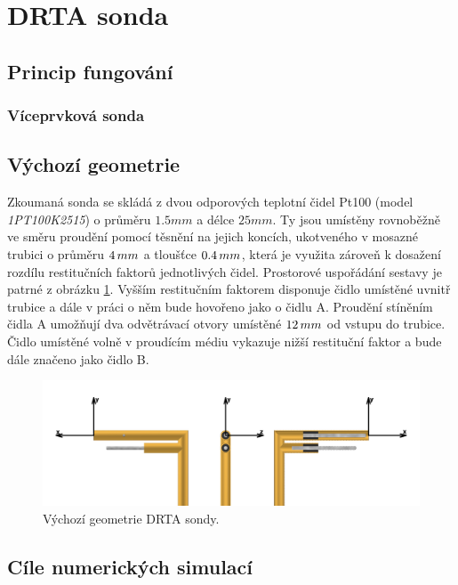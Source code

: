 \section{DRTA sonda}
    \subsection{Princip fungování}
        \subsubsection{Víceprvková sonda}
    \subsection{Výchozí geometrie}
        Zkoumaná sonda se skládá z dvou odporových teplotní čidel Pt100 (model \textit{1PT100K2515}) o průměru $1.5 \unit{mm}$ a délce $25 \unit{mm}$. Ty jsou umístěny rovnoběžně ve směru proudění pomocí těsnění na jejich koncích, ukotveného v mosazné trubici o průměru $4 \, mm$ a tloušťce $0.4 \, mm$, která je využita zároveň k dosažení rozdílu restitučních faktorů jednotlivých čidel. Prostorové uspořádání sestavy je patrné z obrázku \ref{fig:vychozi-DRTA}. Vyšším restitučním faktorem disponuje čidlo umístěné uvnitř trubice a dále v práci o něm bude hovořeno jako o čidlu A. Proudění stíněním čidla A umožňují dva odvětrávací otvory umístěné $12 \, mm$ od vstupu do trubice. Čidlo umístěné volně v proudícím médiu vykazuje nižší restituční faktor a bude dále značeno jako čidlo B.
        
        \begin{figure}[ht!]
            \centering
            \includegraphics[width=\textwidth]{200_DRTA_SONDA/Vychozi_DRTA.png}
            \caption{Výchozí geometrie DRTA sondy.}
            \label{fig:vychozi-DRTA}
        \end{figure}
    \subsection{Cíle numerických simulací}
        